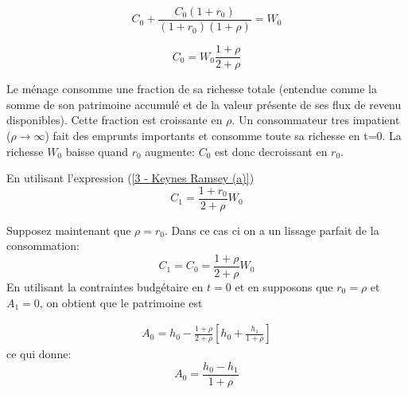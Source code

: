 \documentclass[a4paper,11pt]{article}
\begin{document}
\begin{enumerate}
\begin{equation}
C_{0}+ \frac{C_{0}(1+r_0)}{(1+r_0)(1+\rho)} = W_0  \label{2 - CBI}
\end{equation}



\begin{equation}
C_{0}= W_0 \frac{1+\rho}{2+\rho} \label{2 - CBI9}
\end{equation}

Le m\'{e}nage consomme une fraction de sa richesse totale (entendue
comme la somme de son patrimoine accumul\'{e} et de la valeur pr\'{e}sente
de ses flux de revenu disponibles). Cette fraction est croissante en $\rho$. Un consommateur tres impatient ($\rho \to \infty$) fait des emprunts importants et consomme toute sa richesse en t=0. La richesse $W_0$ baisse quand $r_0$ augmente:  $C_{0}$ est donc decroissant en $r_0$.  


En utilisant l'expression (\ref{3 - Keynes Ramsey (a)}) 
\begin{equation}
C_{1}= \frac{1+r_0}{2+\rho} W_0  \label{2 - CBI9}
\end{equation}

Supposez maintenant que $\rho=r_0.$ Dans ce cas ci on a un lissage parfait de la consommation: 
\begin{equation}
C_{1}=C_0= \frac{1+\rho}{2+\rho} W_0  \label{2 - CBI91}
\end{equation}
En utilisant la contraintes budg\'{e}taire en $t=0$ et en supposons que $r_0=\rho$ et $A{_1}=0$, on obtient que le patrimoine est

\begin{align*}
A_{0}= h_0 -  \frac{1+\rho}{2+\rho} \left[h_0+\frac{h_1}{1+\rho}\right] 
\end{align*}%
ce qui donne: 
\begin{equation}\label{asset}
A_{0}= \frac{h_0-h_1}{1+\rho} 
\end{equation}


\end{enumerate}
\end{document}
